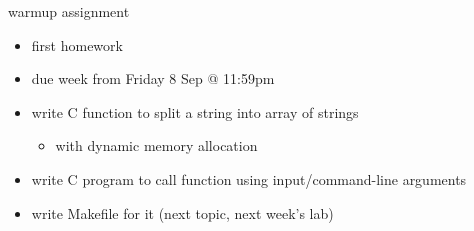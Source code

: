 \begin{frame}{warmup assignment}
\begin{itemize}
\item first homework
\item due week from Friday 8 Sep @ 11:59pm
\vspace{.5cm}
\item write C function to split a string into array of strings
    \begin{itemize}
    \item with dynamic memory allocation
    \end{itemize}
\item write C program to call function using input/command-line arguments
\item write Makefile for it (next topic, next week's lab)
\end{itemize}
\end{frame}
